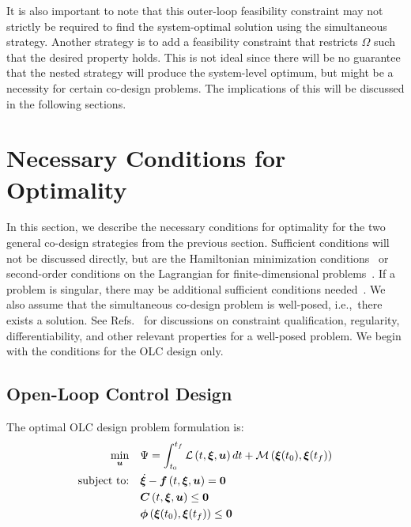 It is also important to note that this outer-loop feasibility constraint may not strictly be required to find the system-optimal solution using the simultaneous strategy.
Another strategy is to add a feasibility constraint that restricts $\Omega$ such that the desired property holds.
This is not ideal since there will be no guarantee that the nested strategy will produce the system-level optimum, but might be a necessity for certain co-design problems.
The implications of this will be discussed in the following sections.

\section{Necessary Conditions for Optimality \label{sec:ch3:conditions}}

In this section, we describe the necessary conditions for optimality for the two general co-design strategies from the previous section. Sufficient conditions will not be discussed directly, but are the Hamiltonian minimization conditions~\cite{Liberzon2012a, Chachuat2007a, Bryson1975a} or second-order conditions on the Lagrangian for finite-dimensional problems~\cite{Papalambros2017a}.
If a problem is singular, there may be additional sufficient conditions needed~\cite{Chachuat2007a, Bryson1975a}.
We also assume that the simultaneous co-design problem is well-posed, i.e.,~there exists a solution. See Refs.~\cite{Liberzon2012a, Chachuat2007a, Papalambros2017a} for discussions on constraint qualification, regularity, differentiability, and other relevant properties for a well-posed problem.
We begin with the conditions for the OLC design only.

\subsection{Open-Loop Control Design}

The optimal OLC design problem formulation is:
\begingroup
\allowdisplaybreaks
\begin{subequations}
\label{eq:ch3:ocsd}
\begin{align}
\min_{\bm{u}} \quad & \Psi = \int_{t_0}^{t_f} \mathcal{L} \left( t, \bm{\xi}, \bm{u} \right) dt + \mathcal{M} \left( \bm{\xi}(t_0), \bm{\xi}(t_f) \right) \\
\text{subject to:} \quad & \dot{\bm{\xi}} - \bm{f} \left( t, \bm{\xi}, \bm{u} \right) = \bm{0} \label{eq:ch3:ocsd_2} \\
& \bm{C} \left( t, \bm{\xi}, \bm{u} \right) \leq \bm{0} \label{eq:ch3:ocsd_3} \\
& \bm{\phi} \left( \bm{\xi}(t_0), \bm{\xi}(t_f) \right) \leq \bm{0} \label{eq:ch3:ocsd_4}
\end{align}
\end{subequations}
\endgroup

